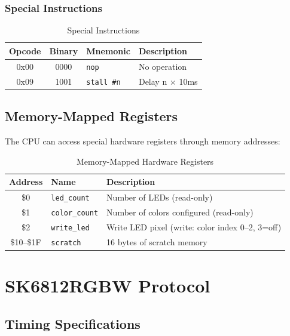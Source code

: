 \documentclass[11pt,a4paper]{article}
\begin{document}
\subsubsection{Special Instructions}

\begin{table}[H]
\centering
\caption{Special Instructions}
\begin{tabular}{@{}cclp{6cm}@{}}
\toprule
\textbf{Opcode} & \textbf{Binary} & \textbf{Mnemonic} & \textbf{Description} \\
\midrule
0x00 & 0000 & \texttt{nop} & No operation \\
0x09 & 1001 & \texttt{stall \#n} & Delay n $\times$ 10ms \\
\bottomrule
\end{tabular}
\end{table}

\subsection{Memory-Mapped Registers}

The CPU can access special hardware registers through memory addresses:

\begin{table}[H]
\centering
\caption{Memory-Mapped Hardware Registers}
\begin{tabular}{@{}clp{7cm}@{}}
\toprule
\textbf{Address} & \textbf{Name} & \textbf{Description} \\
\midrule
\$0 & \texttt{led\_count} & Number of LEDs (read-only) \\
\$1 & \texttt{color\_count} & Number of colors configured (read-only) \\
\$2 & \texttt{write\_led} & Write LED pixel (write: color index 0--2, 3=off) \\
\$10--\$1F & \texttt{scratch} & 16 bytes of scratch memory \\
\bottomrule
\end{tabular}
\end{table}

\section{SK6812RGBW Protocol}

\subsection{Timing Specifications}
\end{document}
